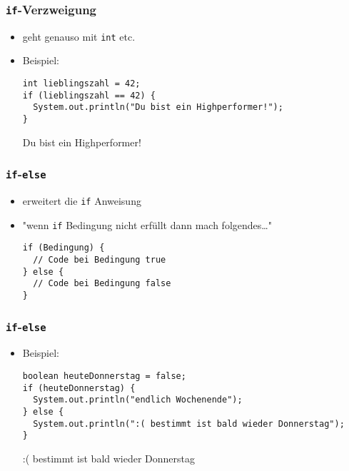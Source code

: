 \documentclass{../../presentation}
\begin{document}
\begin{frame}[fragile]
  \frametitle{\texttt{if}-Verzweigung}
  \pause
  \begin{itemize}
    \item geht genauso mit \texttt{int} etc.
          \pause
    \item Beispiel:
          \begin{verbatim}
int lieblingszahl = 42;
if (lieblingszahl == 42) {
  System.out.println("Du bist ein Highperformer!");
}
      \end{verbatim}
          \pause
          \begin{ausgabe}
            Du bist ein Highperformer!
          \end{ausgabe}
  \end{itemize}
\end{frame}



\begin{frame}[fragile]
  \frametitle{\texttt{if}-\texttt{else}}
  \pause
  \begin{itemize}
    \item erweitert die \texttt{if} Anweisung
          \pause
    \item "wenn \texttt{if} Bedingung nicht erfüllt dann mach folgendes\dots"
          \pause
          \begin{verbatim}
if (Bedingung) {
  // Code bei Bedingung true
} else {
  // Code bei Bedingung false
}
\end{verbatim}
  \end{itemize}
\end{frame}

\begin{frame}[fragile]
  \frametitle{\texttt{if}-\texttt{else}}
  \pause
  \begin{itemize}
    \item Beispiel:
          \begin{verbatim}
boolean heuteDonnerstag = false;
if (heuteDonnerstag) {
  System.out.println("endlich Wochenende");
} else {
  System.out.println(":( bestimmt ist bald wieder Donnerstag");
}
\end{verbatim}
          \pause
          \begin{ausgabe}
            :( bestimmt ist bald wieder Donnerstag
          \end{ausgabe}
  \end{itemize}
\end{frame}
\end{document}

